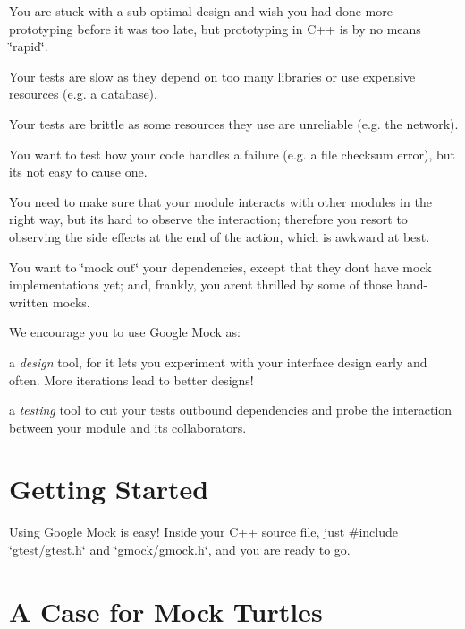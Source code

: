 \begin{DoxyItemize}
\item You are stuck with a sub-\/optimal design and wish you had done more prototyping before it was too late, but prototyping in C++ is by no means \char`\"{}rapid\char`\"{}.
\item Your tests are slow as they depend on too many libraries or use expensive resources (e.\+g. a database).
\item Your tests are brittle as some resources they use are unreliable (e.\+g. the network).
\item You want to test how your code handles a failure (e.\+g. a file checksum error), but it\textquotesingle{}s not easy to cause one.
\item You need to make sure that your module interacts with other modules in the right way, but it\textquotesingle{}s hard to observe the interaction; therefore you resort to observing the side effects at the end of the action, which is awkward at best.
\item You want to \char`\"{}mock out\char`\"{} your dependencies, except that they don\textquotesingle{}t have mock implementations yet; and, frankly, you aren\textquotesingle{}t thrilled by some of those hand-\/written mocks.
\end{DoxyItemize}

We encourage you to use Google Mock as\+:


\begin{DoxyItemize}
\item a {\itshape design} tool, for it lets you experiment with your interface design early and often. More iterations lead to better designs!
\item a {\itshape testing} tool to cut your tests\textquotesingle{} outbound dependencies and probe the interaction between your module and its collaborators.
\end{DoxyItemize}

\section*{Getting Started}

Using Google Mock is easy! Inside your C++ source file, just {\ttfamily \#include} {\ttfamily \char`\"{}gtest/gtest.\+h\char`\"{}} and {\ttfamily \char`\"{}gmock/gmock.\+h\char`\"{}}, and you are ready to go.

\section*{A Case for Mock Turtles}

